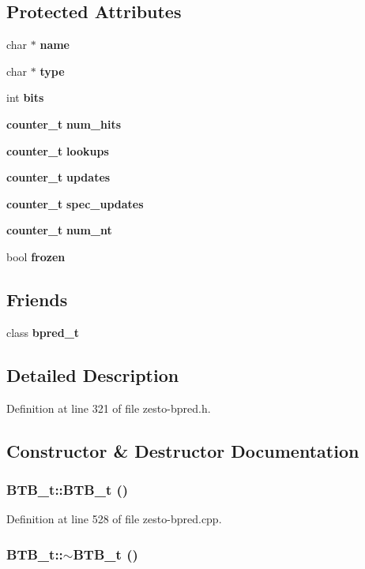 \subsection*{Protected Attributes}
\begin{CompactItemize}
\item 
char $\ast$ {\bf name}
\item 
char $\ast$ {\bf type}
\item 
int {\bf bits}
\item 
{\bf counter\_\-t} {\bf num\_\-hits}
\item 
{\bf counter\_\-t} {\bf lookups}
\item 
{\bf counter\_\-t} {\bf updates}
\item 
{\bf counter\_\-t} {\bf spec\_\-updates}
\item 
{\bf counter\_\-t} {\bf num\_\-nt}
\item 
bool {\bf frozen}
\end{CompactItemize}
\subsection*{Friends}
\begin{CompactItemize}
\item 
class {\bf bpred\_\-t}
\end{CompactItemize}


\subsection{Detailed Description}


Definition at line 321 of file zesto-bpred.h.

\subsection{Constructor \& Destructor Documentation}
\subsubsection[{BTB\_\-t}]{\setlength{\rightskip}{0pt plus 5cm}BTB\_\-t::BTB\_\-t ()}\label{classBTB__t_906ebf9a82a43e4d10d869c66b397138}




Definition at line 528 of file zesto-bpred.cpp.
\subsubsection[{$\sim$BTB\_\-t}]{\setlength{\rightskip}{0pt plus 5cm}BTB\_\-t::$\sim$BTB\_\-t ()\hspace{0.3cm}{\tt  [virtual]}}\label{classBTB__t_9a858280291c82c076333b3318ac4b0b}




